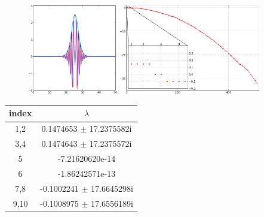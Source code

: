 \documentclass[mathserif, handout]{beamer}
\begin{document}
\begin{frame}[allowframebreaks]
  \begin{figure}[h]
    \centering
    \includegraphics[width=0.35\textwidth]{req1Config} \hfill
    \includegraphics[width=0.55\textwidth]{req1Stability}
    \label{fig:req1Config}
  \end{figure}

  \begin{table}
    \centering
    \begin{tabular}{c | c}
      index & $\lambda$ \\
      \hline
      1,2    &    0.1474653 $\pm$      17.2375582i\\
      3,4    &    0.1474643 $\pm$      17.2375572i\\
      5    &    -7.21620620e-14             \\
      6    &     -1.86242571e-13  \\
      7,8    &   -0.1002241 $\pm$      17.6645298i\\
      9,10    &   -0.1008975 $\pm$      17.6556189i\\
      \hline
    \end{tabular}
    \label{tab:req1Stability}
  \end{table}


\end{frame}
\end{document}
